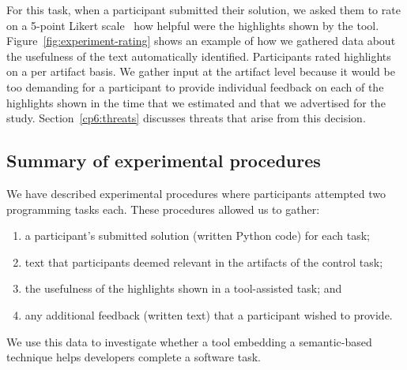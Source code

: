 For this task, when a participant submitted their solution, we asked them to 
rate on a 5-point Likert scale~\cite{likert1932technique} how helpful were the highlights shown by the tool.
Figure~\ref{fig:experiment-rating} shows an example of how we gathered data about the usefulness of the text automatically identified.
Participants rated highlights on a per artifact basis.
We gather input at the artifact level because it would be too demanding for a participant 
to provide individual feedback on each of the highlights shown
in the time that we estimated and that we advertised for the study.
Section~\ref{cp6:threats} discusses  threats that arise from this decision.







\subsection{Summary of experimental procedures}


We have described experimental procedures 
where participants attempted two programming tasks each.
These procedures allowed us to gather:


\begin{enumerate}
\item a participant's submitted solution (written Python code) for each task;
\item text that participants deemed relevant in the artifacts of the control task;
\item the usefulness of the highlights shown in a tool-assisted task; and
\item any additional feedback (written text) that a participant wished to provide.
\end{enumerate}


We use this data to investigate whether 
a tool embedding a semantic-based technique helps developers complete a software task. 




